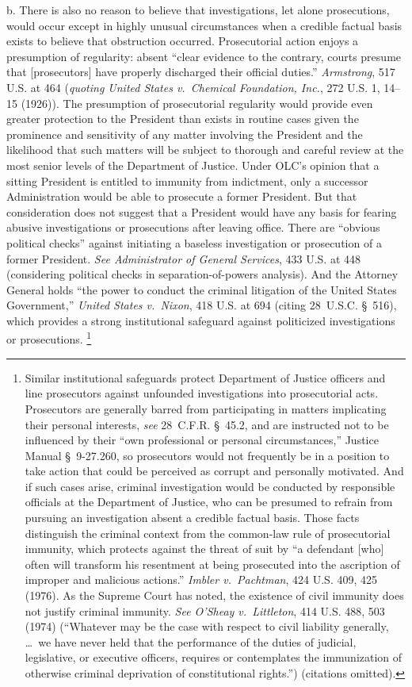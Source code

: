 b. There is also no reason to believe that investigations, let alone prosecutions, would occur except in highly unusual circumstances when a credible factual basis exists to believe that obstruction occurred.
Prosecutorial action enjoys a presumption of regularity: absent ``clear evidence to the contrary, courts presume that [prosecutors] have properly discharged their official duties.''
\textit{Armstrong}, 517 U.S. at 464 (\textit{quoting United States v.\ Chemical Foundation, Inc.}, 272 U.S. 1, 14--15 (1926)).
The presumption of prosecutorial regularity would provide even greater protection to the President than exists in routine cases given the prominence and sensitivity of any matter involving the President and the likelihood that such matters will be subject to thorough and careful review at the most senior levels of the Department of Justice.
Under OLC's opinion that a sitting President is entitled to immunity from indictment, only a successor Administration would be able to prosecute a former President.
But that consideration does not suggest that a President would have any basis for fearing abusive investigations or prosecutions after leaving office.
There are ``obvious political checks'' against initiating a baseless investigation or prosecution of a former President.
\textit{See Administrator of General Services}, 433 U.S. at 448 (considering political checks in separation-of-powers analysis).
And the Attorney General holds ``the power to conduct the criminal litigation of the United States Government,'' \textit{United States v.\ Nixon}, 418 U.S. at 694 (citing 28~U.S.C. \S~516), which provides a strong institutional safeguard against politicized investigations or prosecutions.%
\footnote{Similar institutional safeguards protect Department of Justice officers and line prosecutors against unfounded investigations into prosecutorial acts.
Prosecutors are generally barred from participating in matters implicating their personal interests, \textit{see} 28~C.F.R. \S~45.2, and are instructed not to be influenced by their ``own professional or personal circumstances,'' Justice Manual \S~9-27.260, so prosecutors would not frequently be in a position to take action that could be perceived as corrupt and personally motivated.
And if such cases arise, criminal investigation would be conducted by responsible officials at the Department of Justice, who can be presumed to refrain from pursuing an investigation absent a credible factual basis.
Those facts distinguish the criminal context from the common-law rule of prosecutorial immunity, which protects against the threat of suit by ``a defendant [who] often will transform his resentment at being prosecuted into the ascription of improper and malicious actions.''
\textit{Imbler v.\ Pachtman}, 424 U.S. 409, 425 (1976).
As the Supreme Court has noted, the existence of civil immunity does not justify criminal immunity.
\textit{See O'Sheay v.\ Littleton}, 414 U.S. 488, 503 (1974) (``Whatever may be the case with respect to civil liability generally, \dots\ we have never held that the performance of the duties of judicial, legislative, or executive officers, requires or contemplates the immunization of otherwise criminal deprivation of constitutional rights.'') (citations omitted).}

